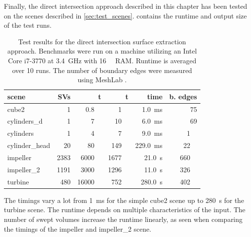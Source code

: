 Finally, the direct intersection approach described in this chapter has been tested on the scenes described in \cref{sec:test_scenes}.
 contains the runtime and output size of the test runs.
%
\begin{table}[!]
	\centering
	\begin{tabular}{lrrrrr}
		scene          & SVs  & t\sub{in} & t\sub{out} & {time} & b. edges\\
		\midrule
		cube2          &    1 & \SI{  0.8}{\kilo\nothing} & \SI{   1}{\kilo\nothing} & \SI{  1.0}{\milli\second}            & \SI{ 75}{     \nothing} \\
		cylinders\_d   &    1 & \SI{    7}{\kilo\nothing} & \SI{  10}{\kilo\nothing} & \SI{  6.0}{\milli\second}            & \SI{ 69}{     \nothing} \\
		cylinders      &    1 & \SI{    4}{\kilo\nothing} & \SI{   7}{\kilo\nothing} & \SI{  9.0}{\milli\second}            & \SI{  1}{\kilo\nothing} \\ %
		cylinder\_head &   20 & \SI{   80}{\kilo\nothing} & \SI{ 149}{\kilo\nothing} & \SI{229.0}{\milli\second}            & \SI{ 22}{\kilo\nothing} \\ %
		impeller       & 2383 & \SI{ 6000}{\kilo\nothing} & \SI{1677}{\kilo\nothing} & \SI{ 21.0}{      \second}\phantom{m} & \SI{660}{\kilo\nothing} \\ %
		impeller\_2    & 1191 & \SI{ 3000}{\kilo\nothing} & \SI{1296}{\kilo\nothing} & \SI{ 11.0}{      \second}\phantom{m} & \SI{326}{\kilo\nothing} \\ %
		turbine        &  480 & \SI{16000}{\kilo\nothing} & \SI{ 752}{\kilo\nothing} & \SI{280.0}{      \second}\phantom{m} & \SI{402}{\kilo\nothing} \\ %
	\end{tabular}
	\caption{
		Test results for the direct intersection surface extraction approach.
		Benchmarks were run on a machine utilizing an Intel Core i7-3770 at \SI{3.4}{\giga\hertz} with \SI{16}{\gibi\byte} RAM.
		Runtime is averaged over 10 runs.
		The number of boundary edges were measured using MeshLab \cite{meshlab}.
	}
	\label{tbl:direct_intersection_results}
\end{table}
%
The timings vary a lot from \SI{1}{\milli\second} for the simple cube2 scene up to \SI{280}{\second} for the turbine scene.
The runtime depends on multiple characteristics of the input.
The number of swept volumes increase the runtime linearly, as seen when comparing the timings of the impeller and impeller\_2 scene.
